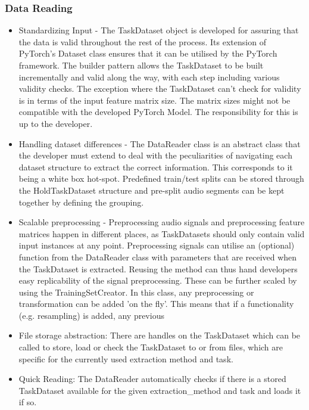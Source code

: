 \subsubsection{Data Reading}
\begin{itemize}
	\item Standardizing Input - The TaskDataset object is developed for assuring that the data is valid throughout the rest of the process. Its extension of PyTorch's Dataset class ensures that it can be utilised by the PyTorch framework. The builder pattern allows the TaskDataset to be built incrementally and valid along the way, with each step including various validity checks.
	The exception where the TaskDataset can't check for validity is in terms of the input feature matrix size. The matrix sizes might not be compatible with the developed PyTorch Model. The responsibility for this is up to the developer.
	\item Handling dataset differences - The DataReader class is an abstract class that the developer must extend to deal with the peculiarities of navigating each dataset structure to extract the correct information. This corresponds to it being a white box hot-spot. Predefined train/test splits can be stored through the HoldTaskDataset structure and pre-split audio segments can be kept together by defining the grouping. 
	\item Scalable preprocessing - Preprocessing audio signals and preprocessing feature matrices happen in different places, as TaskDatasets should only contain valid input instances at any point. Preprocessing signals can utilise an (optional) function from the DataReader class with parameters that are received when the TaskDataset is extracted. Reusing the method can thus hand developers easy replicability of the signal preprocessing. These can be further scaled by using the TrainingSetCreator. In this class, any preprocessing or transformation can be added 'on the fly'. This means that if a functionality (e.g. resampling) is added, any previous 
	\item File storage abstraction: There are handles on the TaskDataset which can be called to store, load or check the TaskDataset to or from files, which are specific for the currently used extraction method and task.
	\item Quick Reading: The DataReader automatically checks if there is a stored TaskDataset available for the given extraction\_method and task and loads it if so.

\end{itemize}
